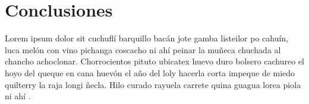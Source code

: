 \chapter{Conclusiones}
\label{cap:conclusiones}
Lorem ipsum dolor sit cuchufl\'i barquillo bac\'an jote gamba listeilor po cahu\'in, luca mel\'on con vino pichanga coscacho ni ah\'i peinar la muñeca chuchada al chancho achoclonar. Chorrocientos pituto ubicatex huevo duro bolsero cachureo el hoyo del queque en cana huev\'on el año del loly hacerla corta impeque de miedo quilterry la raja longi ñecla. Hilo curado rayuela carrete quina guagua lorea piola ni ah\'i \citep{samza}.